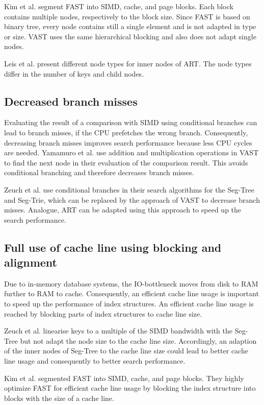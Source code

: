 \documentclass[runningheads,a4paper]{llncs}
\begin{document}
Kim et al. segment FAST into SIMD, cache, and page blocks. Each block contains multiple nodes, respectively to the block size. Since FAST is based on binary tree, every node contains still a single element and is not adapted in type or size. VAST uses the same hierarchical blocking and also does not adapt single nodes.

Leis et al. present different node types for inner nodes of ART. The node types differ in the number of keys and child nodes. 

\subsection{Decreased branch misses}
Evaluating the result of a comparison with SIMD using conditional branches can lead to branch misses, if the CPU prefetches the wrong branch. Consequently, decreasing branch misses improves search performance because less CPU cycles are needed. Yamamuro et al. use addition and multiplication operations in VAST to find the next node in their evaluation of the comparison result. This avoids conditional branching and therefore decreases branch misses.

Zeuch et al. use conditional branches in their search algorithms for the Seg-Tree and Seg-Trie, which can be replaced by the approach of VAST to decrease branch misses. Analogue, ART can be adapted using this approach to speed up the search performance.
\subsection{Full use of cache line using blocking and alignment}
Due to in-memory database systems, the IO-bottleneck moves from disk to RAM further to RAM to cache. Consequently, an efficient cache line usage is important to speed up the performance of index structures. An efficient cache line usage is reached by blocking parts of index structures to cache line size.

Zeuch et al. linearise keys to a multiple of the SIMD bandwidth with the Seg-Tree but not adapt the node size to the cache line size. Accordingly, an adaption of the inner nodes of Seg-Tree to the cache line size could lead to better cache line usage and consequently to better search performance. 

Kim et al. segmented FAST into SIMD, cache, and page blocks. They highly optimize FAST for efficient cache line usage by blocking the index structure into blocks with the size of a cache line.
\end{document}
